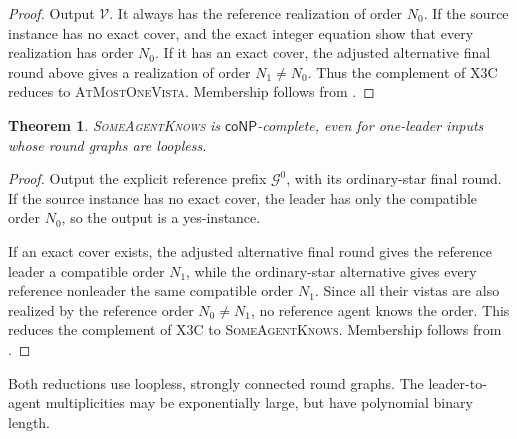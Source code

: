 \documentclass[11pt]{article}
\newtheorem{theorem}{Theorem}
\begin{document}
\begin{proof}
Output \(\mathcal V\). It always has the reference realization of
order \(N_0\). If the source instance has no exact cover,
 and the exact integer equation show that
every realization has order \(N_0\).
If it has an exact cover, the adjusted alternative final round
above gives a realization of order \(N_1\ne N_0\).
Thus the complement of \textsc{X3C} reduces to \textsc{AtMostOneVista}.
Membership follows from .
\end{proof}

\begin{theorem}
\label{thm:conp-network-complete}
\textnormal{\textsc{SomeAgentKnows}} is \(\mathsf{coNP}\)-complete, even for one-leader inputs whose round graphs
are loopless.
\end{theorem}

\begin{proof}
Output the explicit reference prefix \(\mathcal G^0\), with its
ordinary-star final round. If the source instance has no exact
cover, the leader has only the compatible order \(N_0\), so the
output is a yes-instance.

If an exact cover exists, the adjusted alternative final round
gives the reference leader a compatible order \(N_1\), while the
ordinary-star alternative gives every reference nonleader the
same compatible order \(N_1\).
Since all their vistas are also realized by the reference order
\(N_0\ne N_1\), no reference agent knows the order.
This reduces the complement of \textsc{X3C} to \textsc{SomeAgentKnows}.
Membership follows from .
\end{proof}

Both reductions use loopless, strongly connected round graphs.
The leader-to-agent multiplicities may be exponentially large,
but have polynomial binary length.



\end{document}

